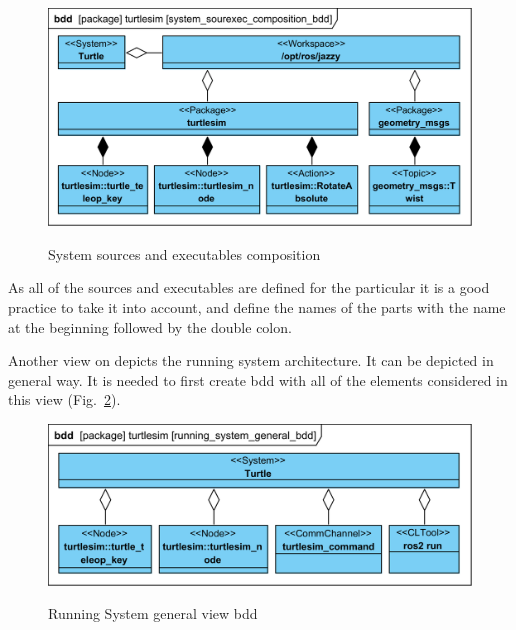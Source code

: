 \documentclass[11pt,oneside,a4paper]{report}
\begin{document}
\begin{figure}[H]
	\centering
	\begin{center}
		{\includegraphics[scale=1.0]{diagrams/system_sourexec_composition_bdd.png}}
	\end{center}
	\caption{System sources and executables composition}
	\label{fig:system_sourexec_composition_bdd}
\end{figure}

As all of the sources and executables are defined for the particular \stPackage{} it is a good practice to take it into account, and define the names of the \stPackage{} parts with the \stPackage{} name at the beginning followed by the double colon. 

Another view on \stSystem{} depicts the running system architecture. It can be depicted in general way. It is needed to first create bdd with all of the elements considered in this view (Fig.~\ref{fig:running_system_general_bdd}).
			
\begin{figure}[H]
	\centering
	\begin{center}
		{\includegraphics[scale=1.0]{diagrams/running_system_general_bdd.png}}
	\end{center}
	\caption{Running System general view bdd}
	\label{fig:running_system_general_bdd}
\end{figure}
\end{document}

